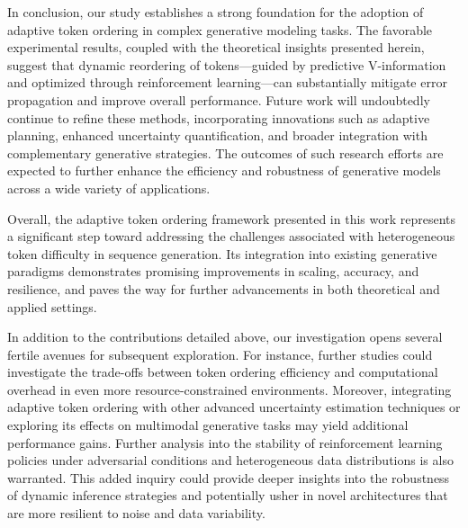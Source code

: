\documentclass{article} %
\begin{document}
\par In conclusion, our study establishes a strong foundation for the adoption of adaptive token ordering in complex generative modeling tasks. The favorable experimental results, coupled with the theoretical insights presented herein, suggest that dynamic reordering of tokens—guided by predictive V-information and optimized through reinforcement learning—can substantially mitigate error propagation and improve overall performance. Future work will undoubtedly continue to refine these methods, incorporating innovations such as adaptive planning, enhanced uncertainty quantification, and broader integration with complementary generative strategies. The outcomes of such research efforts are expected to further enhance the efficiency and robustness of generative models across a wide variety of applications.

\par Overall, the adaptive token ordering framework presented in this work represents a significant step toward addressing the challenges associated with heterogeneous token difficulty in sequence generation. Its integration into existing generative paradigms demonstrates promising improvements in scaling, accuracy, and resilience, and paves the way for further advancements in both theoretical and applied settings.

\par In addition to the contributions detailed above, our investigation opens several fertile avenues for subsequent exploration. For instance, further studies could investigate the trade-offs between token ordering efficiency and computational overhead in even more resource-constrained environments. Moreover, integrating adaptive token ordering with other advanced uncertainty estimation techniques or exploring its effects on multimodal generative tasks may yield additional performance gains. Further analysis into the stability of reinforcement learning policies under adversarial conditions and heterogeneous data distributions is also warranted. This added inquiry could provide deeper insights into the robustness of dynamic inference strategies and potentially usher in novel architectures that are more resilient to noise and data variability.




\end{document}
